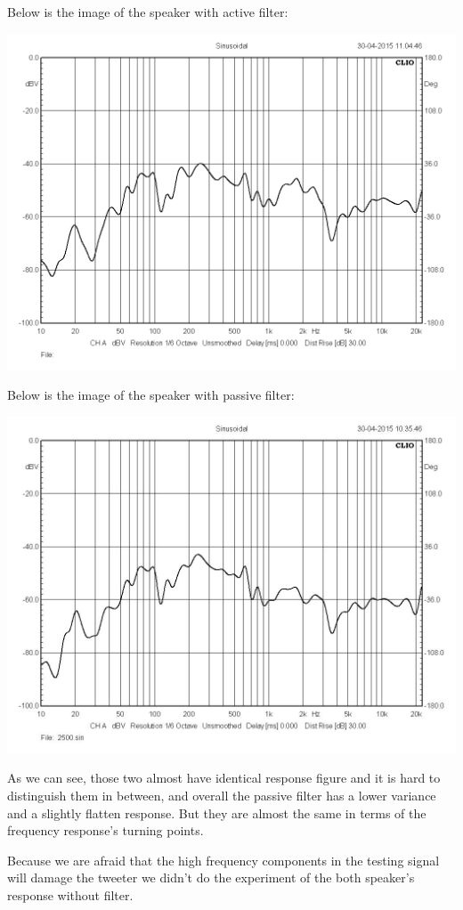 \documentclass[11pt]{scrartcl}
\begin{document}
Below is the image of the speaker with active filter:
\begin{center}
\begin{minipage}[t]{\linewidth}

{
\includegraphics[scale = 0.3]{passive.png}
}
\end{minipage}
\medskip
\end{center}
Below is the image of the speaker with passive filter:
\begin{center}
\begin{minipage}[t]{\linewidth}

{
\includegraphics[scale = 0.3]{active.jpg}
}
\end{minipage}
\medskip
\end{center}

As we can see, those two almost have identical response figure and it is hard to distinguish them in between, and overall the passive filter has a lower variance and a slightly flatten response. But they are almost the same in terms of the frequency response's turning points.

Because we are afraid that the high frequency components in the testing signal will damage the tweeter we didn't do the experiment of the both speaker's response without filter.
\end{document}
